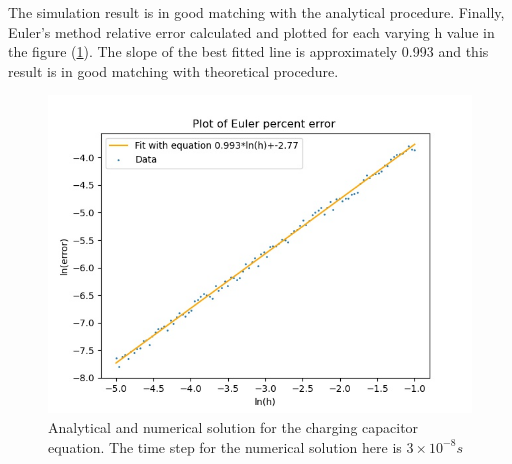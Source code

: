 \documentclass[12pt, a4paper]{article}
\begin{document}
	The simulation result is in good matching with the analytical procedure. Finally, Euler's method relative error calculated and plotted for each varying h value in the figure (\ref{fig:q1_euler_error}). The slope of the best fitted line is approximately 0.993 and this
	result is in good matching with theoretical procedure.
		\begin{figure}[h]
			\centering
			\includegraphics[width=0.8\linewidth]{../q1/q1_Euler_error_1e-05_0.1_100_0.021.jpg}
			\caption{Analytical and numerical solution for the charging capacitor equation. The time step for the numerical solution here is $3\times10^{-8} s$}
			\label{fig:q1_euler_error}
		\end{figure}
\end{document}
